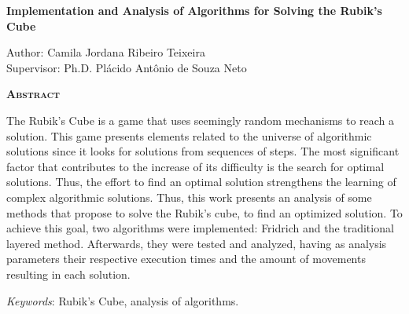 \begin{center}
	{\Large{\textbf{Implementation and Analysis of Algorithms for Solving the Rubik's Cube}}}
\end{center}

\vspace{1cm}

\begin{flushright}
	Author: Camila Jordana Ribeiro Teixeira\\
	Supervisor: Ph.D. Plácido Antônio de Souza Neto
\end{flushright}

\vspace{1cm}

\begin{center}
	\Large{\textsc{\textbf{Abstract}}}
\end{center}

\noindent The Rubik’s Cube is a game that uses seemingly random mechanisms to reach a solution. This game presents elements related to the universe of algorithmic solutions since it looks for solutions from sequences of steps. The most significant factor that contributes to the increase of its difficulty is the search for optimal solutions. Thus, the effort to find an optimal solution strengthens the learning of complex algorithmic solutions. Thus, this work presents an analysis of some methods that propose to solve the Rubik’s cube, to find an optimized solution. To achieve this goal, two algorithms were implemented: Fridrich and the traditional layered method. Afterwards, they were tested and analyzed, having as analysis parameters their respective execution times and the amount of movements resulting in each solution.

\noindent\textit{Keywords}: Rubik’s Cube, analysis of algorithms.